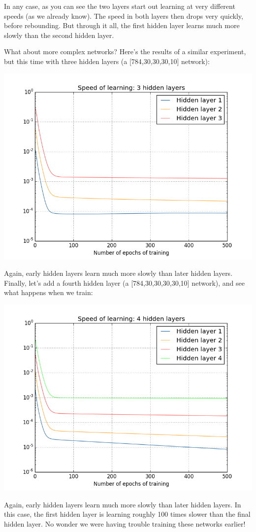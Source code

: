 \documentclass[a4paper,twoside,10pt]{book}
\begin{document}
In any case, as you can see the two layers start out learning at very different speeds (as we already know). The speed in both layers then drops very quickly, before rebounding. But through it all, the first hidden layer learns much more slowly than the second hidden layer.

What about more complex networks? Here's the results of a similar experiment, but this time with three hidden layers (a [784,30,30,30,10] network):
\begin{center}
	\includegraphics[width=0.7\linewidth]{figures/ch5/training_speed_3_layers}
\end{center}
Again, early hidden layers learn much more slowly than later hidden layers. Finally, let's add a fourth hidden layer (a [784,30,30,30,30,10] network), and see what happens when we train:
\begin{center}
	\includegraphics[width=0.7\linewidth]{figures/ch5/training_speed_4_layers}
\end{center}
Again, early hidden layers learn much more slowly than later hidden layers. In this case, the first hidden layer is learning roughly 100 times slower than the final hidden layer. No wonder we were having trouble training these networks earlier!
\end{document}
